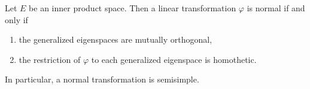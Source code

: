 Let $E$ be an inner product space. Then a linear transformation $\varphi$ is normal if and only if
\begin{enumerate}
  \item[(i)] the generalized eigenspaces are mutually orthogonal,
  \item[(ii)] the restriction of $\varphi$ to each generalized eigenspace is homothetic.
\end{enumerate}
In particular, a normal transformation is semisimple.
